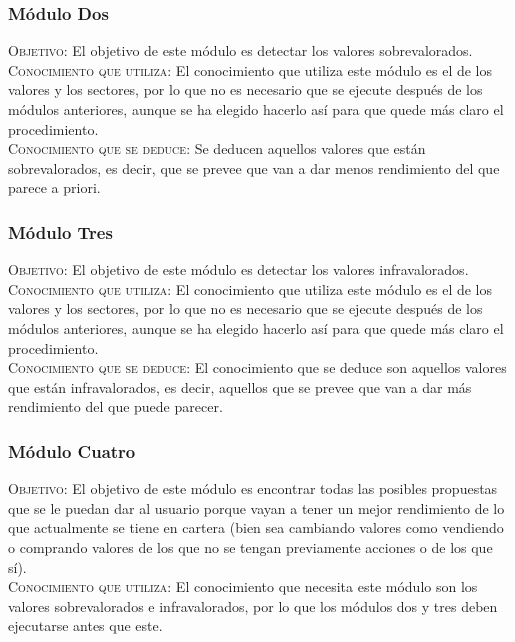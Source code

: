 \documentclass[12pt]{article}
\begin{document}
\subsubsection{Módulo Dos}
\textsc{Objetivo}: El objetivo de este módulo es detectar los valores sobrevalorados.\\

\textsc{Conocimiento que utiliza}: El conocimiento que utiliza este módulo es el de los valores y los sectores, por lo que no es necesario que se ejecute después de los módulos anteriores, aunque se ha elegido hacerlo así para que quede más claro el procedimiento.\\

\textsc{Conocimiento que se deduce}: Se deducen aquellos valores que están sobrevalorados, es decir, que se prevee que van a dar menos rendimiento del que parece a priori.

\subsubsection{Módulo Tres}
\textsc{Objetivo}: El objetivo de este módulo es detectar los valores infravalorados.\\

\textsc{Conocimiento que utiliza}: El conocimiento que utiliza este módulo es el de los valores y los sectores, por lo que no es necesario que se ejecute después de los módulos anteriores, aunque se ha elegido hacerlo así para que quede más claro el procedimiento.\\

\textsc{Conocimiento que se deduce}: El conocimiento que se deduce son aquellos valores que están infravalorados, es decir, aquellos que se prevee que van a dar más rendimiento del que puede parecer.

\subsubsection{Módulo Cuatro}
\textsc{Objetivo}: El objetivo de este módulo es encontrar todas las posibles propuestas que se le puedan dar al usuario porque vayan a tener un mejor rendimiento de lo que actualmente se tiene en cartera (bien sea cambiando valores como vendiendo o comprando valores de los que no se tengan previamente acciones o de los que sí).\\

\textsc{Conocimiento que utiliza}: El conocimiento que necesita este módulo son los valores sobrevalorados e infravalorados, por lo que los módulos dos y tres deben ejecutarse antes que este.\\
\end{document}
